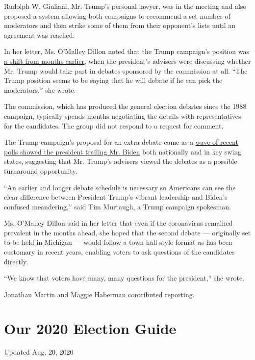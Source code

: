 Rudolph W. Giuliani, Mr. Trump's personal lawyer, was in the meeting and
also proposed a system allowing both campaigns to recommend a set number
of moderators and then strike some of them from their opponent's lists
until an agreement was reached.

In her letter, Ms. O'Malley Dillon noted that the Trump campaign's
position was
\href{https://www.nytimes3xbfgragh.onion/2019/12/12/us/politics/trump-presidential-debate-democrat.html}{a
shift from months earlier}, when the president's advisers were
discussing whether Mr. Trump would take part in debates sponsored by the
commission at all. ``The Trump position seems to be saying that he will
debate if he can pick the moderators,'' she wrote.

The commission, which has produced the general election debates since
the 1988 campaign, typically spends months negotiating the details with
representatives for the candidates. The group did not respond to a
request for comment.

The Trump campaign's proposal for an extra debate came as a
\href{https://www.nytimes3xbfgragh.onion/2020/06/09/upshot/polling-trump-erosion-support.html}{wave
of recent polls showed the president trailing Mr. Biden} both nationally
and in key swing states, suggesting that Mr. Trump's advisers viewed the
debates as a possible turnaround opportunity.

``An earlier and longer debate schedule is necessary so Americans can
see the clear difference between President Trump's vibrant leadership
and Biden's confused meandering,'' said Tim Murtaugh, a Trump campaign
spokesman.

Ms. O'Malley Dillon said in her letter that even if the coronavirus
remained prevalent in the months ahead, she hoped that the second debate
--- originally set to be held in Michigan --- would follow a
town-hall-style format as has been customary in recent years, enabling
voters to ask questions of the candidates directly.

``We know that voters have many, many questions for the president,'' she
wrote.

Jonathan Martin and Maggie Haberman contributed reporting.

\hypertarget{our-2020-election-guide}{%
\section{Our 2020 Election Guide}\label{our-2020-election-guide}}

Updated Aug. 20, 2020

